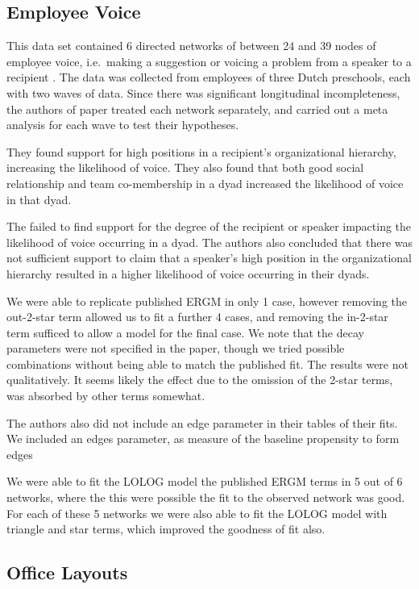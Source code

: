 \documentclass[
]{statsoc}
\begin{document}
\subsection{Employee Voice}

This data set contained 6 directed networks of between 24 and 39 nodes
of employee voice, i.e.~making a suggestion or voicing a problem from a
speaker to a recipient \cite{Pauksktat2011}. The data was collected from
employees of three Dutch preschools, each with two waves of data. Since
there was significant longitudinal incompleteness, the authors of paper
treated each network separately, and carried out a meta analysis for
each wave to test their hypotheses.

They found support for high positions in a recipient's organizational
hierarchy, increasing the likelihood of voice. They also found that both
good social relationship and team co-membership in a dyad increased the
likelihood of voice in that dyad.

The failed to find support for the degree of the recipient or speaker
impacting the likelihood of voice occurring in a dyad. The authors also
concluded that there was not sufficient support to claim that a
speaker's high position in the organizational hierarchy resulted in a
higher likelihood of voice occurring in their dyads.

We were able to replicate published ERGM in only 1 case, however
removing the out-2-star term allowed us to fit a further 4 cases, and
removing the in-2-star term sufficed to allow a model for the final
case. We note that the decay parameters were not specified in the paper,
though we tried possible combinations without being able to match the
published fit. The results were not qualitatively. It seems likely the
effect due to the omission of the 2-star terms, was absorbed by other
terms somewhat.

The authors also did not include an edge parameter in their tables of
their fits. We included an edges parameter, as measure of the baseline
propensity to form edges

We were able to fit the LOLOG model the published ERGM terms in 5 out of
6 networks, where the this were possible the fit to the observed network
was good. For each of these 5 networks we were also able to fit the
LOLOG model with triangle and star terms, which improved the goodness of
fit also.

\subsection{Office Layouts}
\end{document}
